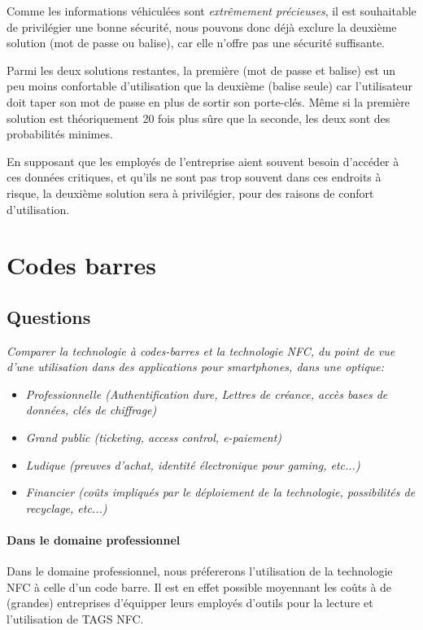 \documentclass[a4paper,11pt,titlepage]{article}
\begin{document}
Comme les informations véhiculées sont \emph{extrêmement précieuses}, il est souhaitable de privilégier une bonne
sécurité, nous pouvons donc déjà exclure la deuxième solution (mot de passe ou balise), car elle n'offre pas une
sécurité suffisante.

Parmi les deux solutions restantes, la première (mot de passe et balise) est un peu moins confortable d'utilisation
que la deuxième (balise seule) car l'utilisateur doit taper son mot de passe en plus de sortir son porte-clés. Même
si la première solution est théoriquement 20 fois plus sûre que la seconde, les deux sont des probabilités minimes.

En supposant que les employés de l'entreprise aient souvent besoin d'accéder à ces données critiques, et qu'ils ne
sont pas trop souvent dans ces endroits à risque, la deuxième solution sera à privilégier, pour des raisons de confort
d'utilisation.

\section{Codes barres}
\subsection*{Questions}
\textit{Comparer la technologie à codes-barres et la technologie NFC, du point de vue d'une utilisation dans
des applications pour smartphones, dans une optique:}
\begin{itemize}
\item \textit{Professionnelle (Authentification dure, Lettres de créance, accès bases de données, clés de chiffrage)}
\item \textit{Grand public (ticketing, access control, e-paiement)}
\item \textit{Ludique (preuves d'achat, identité électronique pour gaming, etc...)}
\item \textit{Financier (coûts impliqués par le déploiement de la technologie, possibilités de recyclage, etc...)}
\end{itemize}

\paragraph{Dans le domaine professionnel}

Dans le domaine professionnel, nous préfererons l'utilisation de la technologie NFC à celle d'un code barre.
Il est en effet possible moyennant les coûts à de (grandes) entreprises d'équipper leurs employés d'outils pour la lecture et l'utilisation de TAGS NFC.
\end{document}
